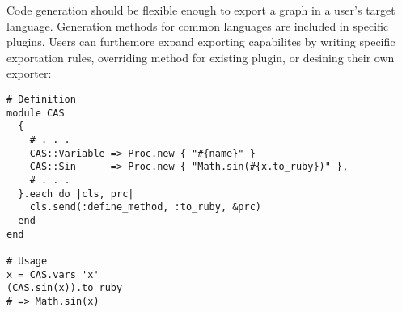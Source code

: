Code generation should be flexible enough to export a graph in a user's target language. Generation methods for common languages are included in specific plugins. Users can furthemore expand exporting capabilites by writing specific exportation rules,  overriding method for existing plugin, or desining their own exporter:

\noindent%
\begin{lstlisting}[caption={Example of Ruby exportation plugin},label={code:example-exporting}]
# Definition
module CAS
  {
    # . . .
    CAS::Variable => Proc.new { "#{name}" }
    CAS::Sin      => Proc.new { "Math.sin(#{x.to_ruby})" },
    # . . .
  }.each do |cls, prc|
    cls.send(:define_method, :to_ruby, &prc)
  end
end

# Usage
x = CAS.vars 'x'
(CAS.sin(x)).to_ruby
# => Math.sin(x)
\end{lstlisting}
